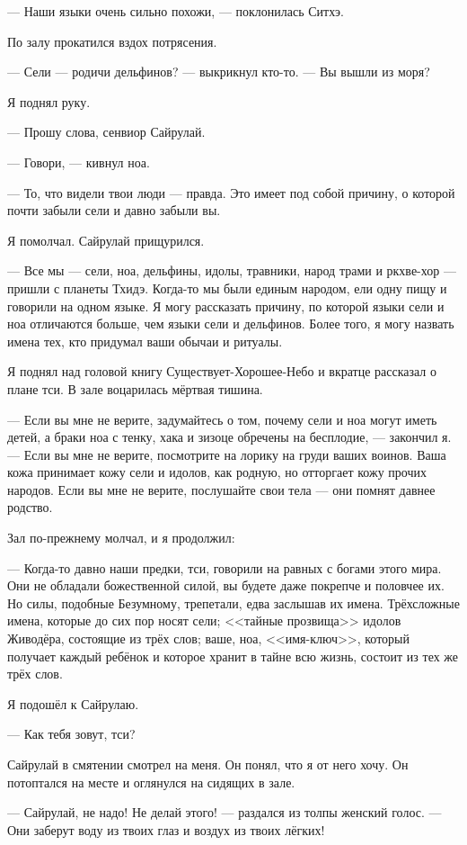 --- Наши языки очень сильно похожи, --- поклонилась Ситхэ.

По залу прокатился вздох потрясения.

--- Сели --- родичи дельфинов? --- выкрикнул кто-то.
--- Вы вышли из моря?

Я поднял руку.

--- Прошу слова, сенвиор Сайрулай.

--- Говори, --- кивнул ноа.

--- То, что видели твои люди --- правда.
Это имеет под собой причину, о которой почти забыли сели и давно забыли вы.

Я помолчал. Сайрулай прищурился.

--- Все мы --- сели, ноа, дельфины, идолы, травники, народ трами и ркхве-хор --- пришли с планеты Тхидэ.
Когда-то мы были единым народом, ели одну пищу и говорили на одном языке.
Я могу рассказать причину, по которой языки сели и ноа отличаются больше, чем языки сели и дельфинов.
Более того, я могу назвать имена тех, кто придумал ваши обычаи и ритуалы.

Я поднял над головой книгу Существует-Хорошее-Небо и вкратце рассказал о плане тси.
В зале воцарилась мёртвая тишина.

--- Если вы мне не верите, задумайтесь о том, почему сели и ноа могут иметь детей, а браки ноа с тенку, хака и зизоце обречены на бесплодие, --- закончил я.
--- Если вы мне не верите, посмотрите на лорику на груди ваших воинов.
Ваша кожа принимает кожу сели и идолов, как родную, но отторгает кожу прочих народов.
Если вы мне не верите, послушайте свои тела --- они помнят давнее родство.

Зал по-прежнему молчал, и я продолжил:

--- Когда-то давно наши предки, тси, говорили на равных с богами этого мира.
Они не обладали божественной силой, вы будете даже покрепче и половчее их.
Но силы, подобные Безумному, трепетали, едва заслышав их имена.
Трёхсложные имена, которые до сих пор носят сели;
<<тайные прозвища>> идолов Живодёра, состоящие из трёх слов;
ваше, ноа, <<имя-ключ>>, который получает каждый ребёнок и которое хранит в тайне всю жизнь, состоит из тех же трёх слов.

Я подошёл к Сайрулаю.

--- Как тебя зовут, тси?

Сайрулай в смятении смотрел на меня.
Он понял, что я от него хочу.
Он потоптался на месте и оглянулся на сидящих в зале.

--- Сайрулай, не надо!
Не делай этого! --- раздался из толпы женский голос.
--- Они заберут воду из твоих глаз и воздух из твоих лёгких!

